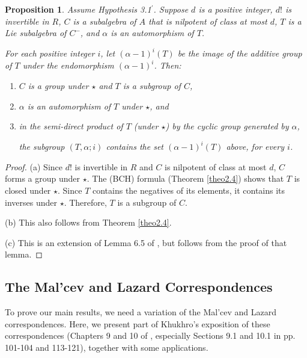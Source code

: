 \documentclass[mathscr]{amsart}
\theoremstyle{theorem}
\newtheorem{prop}[theorem]{Proposition}
\theoremstyle{definition}
\numberwithin{equation}{section}
\def \({\left(}
\def \){\right)}
\begin{document}
\begin{prop}
Assume Hypothesis 3.1$^\prime$. %
Suppose $d$ is a positive integer, $d!$ is invertible in $R$, $C$ is
a subalgebra of $A$ that is nilpotent of class at most $d$, $T$ is a
Lie subalgebra of $C^{-}$, and $\alpha$ is an automorphism of $T$.

For each positive integer $i$, let $\(\alpha-1\)^i(T)$ be the image
of the additive group of $T$ under the endomorphism
$\(\alpha-1\)^i$. Then:

\begin{enumerate}
\item[(a)] $C$ is a group under $\star$ and $T$ is a subgroup of
$C$,
\item[(b)] $\alpha$ is an automorphism of $T$ under $\star$, and
\item[(c)] in the semi-direct product of $T$ (under $\star$) by the
cyclic group generated by $\alpha$,
\begin{center}
the subgroup $\(T,\alpha;i\)$ contains the set $\(\alpha-1\)^i(T)$
above, for every $i$.
\end{center}
\end{enumerate}
\end{prop}

\begin{proof}
(a) Since $d!$ is invertible in $R$ and $C$ is nilpotent of class at
most $d$, $C$ forms a group under $\star$.  The (BCH) formula
(Theorem \ref{theo2.4}) shows that $T$ is closed under $\star$.
Since $T$ contains the negatives of its elements, it contains its
inverses under $\star$.  Therefore, $T$ is a subgroup of $C$.

(b) This also follows from Theorem \ref{theo2.4}.

(c) This is an extension of Lemma 6.5 %
of \cite{GG-CL}, but follows from the proof of that lemma.
\end{proof}

\newpage

\begin{center}\section{The Mal'cev and Lazard Correspondences}
\label{sec4}
\end{center}

To prove our main results, we need a variation of the Mal'cev and
Lazard correspondences. Here, we present part of Khukhro's
exposition of these correspondences (Chapters 9 and 10 of \cite{Kh},
especially Sections 9.1 and 10.1 in pp. 101-104 and 113-121),
together with some applications.
\end{document}
